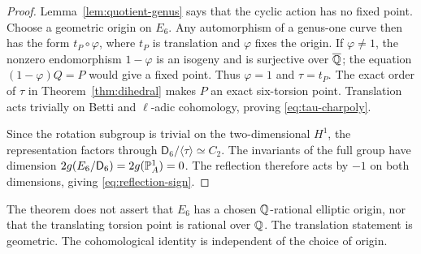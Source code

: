 \begin{proof}
Lemma~\ref{lem:quotient-genus} says that the cyclic action has no fixed
point.  Choose a geometric origin on $E_6$.  Any automorphism of a genus-one
curve then has the form $t_P\circ\varphi$, where $t_P$ is translation and
$\varphi$ fixes the origin.  If $\varphi\ne1$, the nonzero endomorphism
$1-\varphi$ is an isogeny and is surjective over $\overline{\mathbb Q}$; the equation
$(1-\varphi)Q=P$ would give a fixed point.  Thus $\varphi=1$ and $\tau=t_P$.
The exact order of $\tau$ in Theorem~\ref{thm:dihedral} makes $P$ an exact
six-torsion point.  Translation acts trivially on Betti and \(\ell\)-adic
cohomology, proving \eqref{eq:tau-charpoly}.

Since the rotation subgroup is trivial on the two-dimensional $H^1$, the
representation factors through
$\mathsf D_6/\langle\tau\rangle\simeq C_2$.  The invariants of the full
group have dimension $2g(E_6/\mathsf D_6)=2g(\mathbb P^1_A)=0$.  The reflection
therefore acts by $-1$ on both dimensions, giving
\eqref{eq:reflection-sign}.
\end{proof}

\begin{remark}
The theorem does not assert that $E_6$ has a chosen $\mathbb Q$-rational elliptic
origin, nor that the translating torsion point is rational over $\mathbb Q$.  The
translation statement is geometric.  The cohomological identity is
independent of the choice of origin.
\end{remark}
